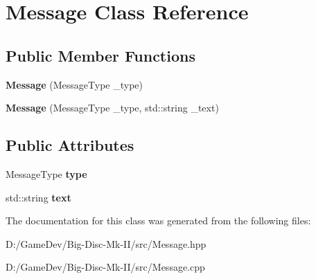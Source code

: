\hypertarget{class_message}{}\section{Message Class Reference}
\label{class_message}
\subsection*{Public Member Functions}
\begin{DoxyCompactItemize}
\item 
\mbox{\label{class_message_a6acca69fc84e8053adde1d8e8a8d4fcd}} 
{\bfseries Message} (Message\+Type \+\_\+type)
\item 
\mbox{\label{class_message_a74d75c28237f63759b584059f9f401d1}} 
{\bfseries Message} (Message\+Type \+\_\+type, std\+::string \+\_\+text)
\end{DoxyCompactItemize}
\subsection*{Public Attributes}
\begin{DoxyCompactItemize}
\item 
\mbox{\label{class_message_a6fc78df47d3755e088e7c658db565fc5}} 
Message\+Type {\bfseries type}
\item 
\mbox{\label{class_message_a6643d6d90c0fdb11886b17d44a7a8183}} 
std\+::string {\bfseries text}
\end{DoxyCompactItemize}


The documentation for this class was generated from the following files\+:\begin{DoxyCompactItemize}
\item 
D\+:/\+Game\+Dev/\+Big-\/\+Disc-\/\+Mk-\/\+I\+I/src/Message.\+hpp\item 
D\+:/\+Game\+Dev/\+Big-\/\+Disc-\/\+Mk-\/\+I\+I/src/Message.\+cpp\end{DoxyCompactItemize}
